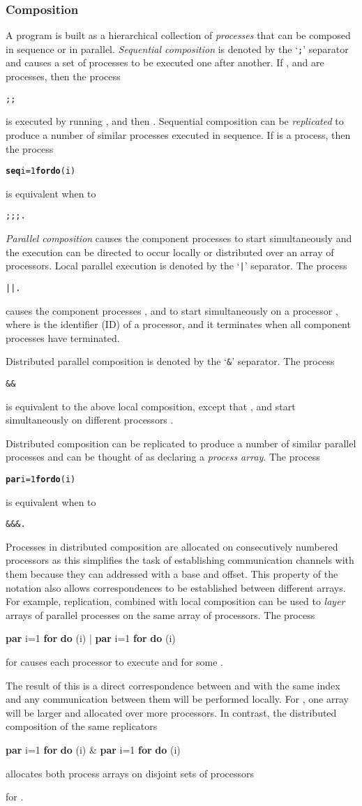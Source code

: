 \documentclass[11pt, conference, compsocconf, onecolumn]{IEEEtran}
\newcommand{\ttt}[1]{\texttt{#1}}
\newcounter{process}
\newcommand{\w}[1]{{\bf #1}}
\newcommand{\inputtikz}[1]{
\begin{center}\end{center}}
\def\codespacing{1.5mm}
\newenvironment{myquote}
{\list{}{\leftmargin=4mm\rightmargin=4mm}\item[]}
{\endlist}
\newenvironment{code*}{\vspace{\codespacing}\begin{myquote}\begin{minipage}{\linewidth}\begin{alltt}}
{\end{alltt}\end{minipage}
\end{myquote}\vspace{\codespacing}
}
\newcommand{\code}[1]{
\vspace{\codespacing}\begin{myquote}\begin{alltt}#1\end{alltt}\end{myquote}\vspace{\codespacing}
}
\begin{document}
\subsubsection{Composition}

A program is built as a hierarchical collection of \emph{processes} that can be
composed in sequence or in parallel. \emph{Sequential composition} is denoted
by the `\ttt{;}' separator and causes a set of processes to be executed one
after another. If ,  and  are processes, then the process 
\code{ ;  ; } 
is executed by running ,  and then .  Sequential composition can be
\emph{replicated} to produce a number of similar processes executed in
sequence. If  is a process, then the process
\code{\w{seq} i=1 \w{for}  \w{do} (i)}
is equivalent when  to \code{ ;  ;  ; .}
\emph{Parallel composition} causes the component processes to start
simultaneously and the execution can be directed to occur locally or
distributed over an array of processors.  Local parallel execution is denoted
by the `\ttt{|}' separator. The process
\code{ |  | .}
causes the component processes ,  and  to start simultaneously on a
processor , where  is the identifier (ID) of a processor, and it
terminates when all component processes have terminated.
\inputtikz{figures/par-composition-local}
Distributed parallel composition is denoted by the `\ttt{\&}' separator.
The process
\code{ \&  \& } 
is equivalent to the above local composition, except that , 
and  start simultaneously on different processors .
\inputtikz{figures/par-composition}
Distributed composition can be replicated to produce a number of similar
parallel processes and can be thought of as declaring a \emph{process array}.
The process 
\code{\w{par} i=1 \w{for}  \w{do} (i)}
is equivalent when  to
\code{ \&  \&  \& .}



Processes in distributed composition are allocated on consecutively numbered
processors as this simplifies the task of establishing communication channels
with them because they can addressed with a base and offset.
This property of the notation also allows correspondences to be
established between different arrays.
For example, replication, combined with local composition can be used to
\emph{layer} arrays of parallel processes on the same array of processors. The
process
\begin{code*}
\w{par} i=1 \w{for}  \w{do} (i) | 
\w{par} i=1 \w{for}  \w{do} (i)
\end{code*}
for  causes each processor  to execute
 and  for some .
\inputtikz{figures/par-replication-layered}
The result of this is a direct correspondence between  and 
with the same index and any communication between them will be performed
locally. For , one array will be larger and allocated over more
processors.
In contrast, the distributed composition of the same replicators
\begin{code*}
\w{par} i=1 \w{for}  \w{do} (i) \& 
\w{par} i=1 \w{for}  \w{do} (i)
\end{code*}
allocates both process arrays on disjoint sets of processors
\inputtikz{figures/par-replication-disjoint}
for .
\end{document}
